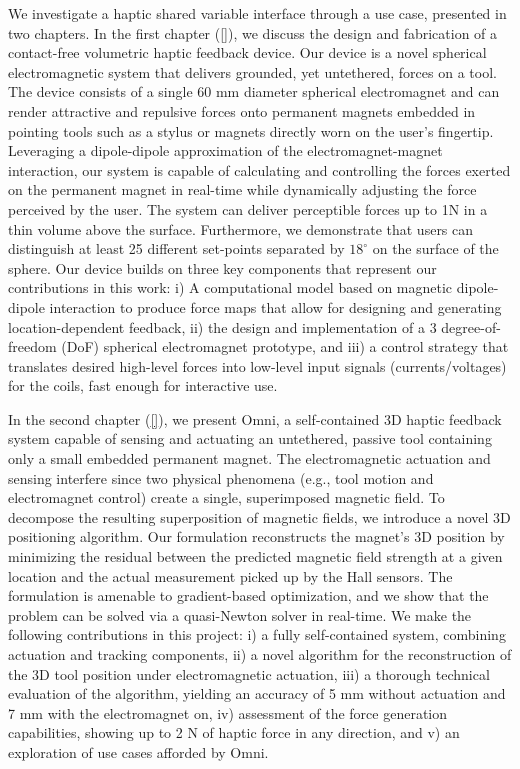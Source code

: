 We investigate a haptic shared variable interface through a use case, presented in two chapters. In the first chapter (\ref{}), we discuss the design and fabrication of a contact-free volumetric haptic feedback device. Our device is a novel spherical electromagnetic system that delivers grounded, yet untethered, forces on a tool. The device consists of a single 60 mm diameter spherical electromagnet and can render attractive and repulsive forces onto permanent magnets embedded in pointing tools such as a stylus or magnets directly worn on the user’s fingertip. Leveraging a dipole-dipole approximation of the electromagnet-magnet interaction, our system is capable of calculating and controlling the forces exerted on the permanent magnet in real-time while dynamically adjusting the force perceived by the user. The system can deliver perceptible forces up to 1N in a thin volume above the surface. Furthermore, we demonstrate that users can distinguish at least 25 different set-points separated by $18^\circ$ on the surface of the sphere. Our device builds on three key components that represent our contributions in this work: i) A computational model based on magnetic dipole-dipole interaction to produce force maps that allow for designing and generating location-dependent feedback, ii) the design and implementation of a 3 degree-of-freedom (DoF) spherical electromagnet prototype, and iii) a control strategy that translates desired high-level forces into low-level input signals (currents/voltages) for the coils, fast enough for interactive use.

In the second chapter (\ref{}), we present Omni, a self-contained 3D haptic feedback system capable of sensing and actuating an untethered, passive tool containing only a small embedded permanent magnet. The electromagnetic actuation and sensing interfere since two physical phenomena (e.g., tool motion and electromagnet control) create a single, superimposed magnetic field. To decompose the resulting superposition of magnetic fields, we introduce a novel 3D positioning algorithm. Our formulation reconstructs the magnet’s 3D position by minimizing the residual between the predicted magnetic field strength at a given location and the actual measurement picked up by the Hall sensors. The formulation is amenable to gradient-based optimization, and we show that the problem can be solved via a quasi-Newton solver in real-time. We make the following contributions in this project: i) a fully self-contained system, combining actuation and tracking components, ii) a novel algorithm for the reconstruction of the 3D tool position under electromagnetic actuation, iii) a thorough technical evaluation of the algorithm, yielding an accuracy of 5 mm without actuation and 7 mm with the electromagnet on, iv) assessment of the force generation capabilities, showing up to 2 N of haptic force in any direction, and v) an exploration of use cases afforded by Omni.

